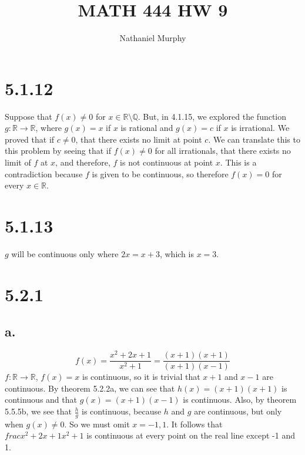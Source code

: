 \documentclass[11pt]{article}
\title{\textbf{MATH 444 HW 9}}
\author{Nathaniel Murphy}
\date{}
\begin{document}
\maketitle

\section*{5.1.12}
Suppose that $f(x)\neq 0$ for $x \in \mathbb{R} \setminus \mathbb{Q}$. But, in 4.1.15, we explored the function $g:\mathbb{R}\rightarrow\mathbb{R}$, where $g(x)=x$ if $x$ is rational and $g(x)=c$ if $x$ is irrational. We proved that if $c\neq 0$, that there exists no limit at point $c$. We can translate this to this problem by seeing that if $f(x)\neq 0$ for all irrationals, that there exists no limit of $f$ at $x$, and therefore, $f$ is not continuous at point $x$. This is a contradiction because $f$ is given to be continuous, so therefore $f(x)=0$ for every $x\in\mathbb{R}$.

\section*{5.1.13}
$g$ will be continuous only where $2x=x+3$, which is $x=3$.

\section*{5.2.1}
\subsection*{a.}
\[f(x)=\frac{x^2+2x+1}{x^2+1}=\frac{(x+1)(x+1)}{(x+1)(x-1)}\]
$f:\mathbb{R}\rightarrow\mathbb{R}$, $f(x)=x$ is continuous, so it is trivial that $x+1$ and $x-1$ are continuous. By theorem 5.2.2a, we can see that $h(x)=(x+1)(x+1)$ is continuous and that $g(x)=(x+1)(x-1)$ is continuous. Also, by theorem 5.5.5b, we see that $\frac{h}{g}$ is continuous, because $h$ and $g$ are continuous, but only when $g(x)\neq 0$. So we must omit $x=-1,1$. It follows that $frac{x^2+2x+1}{x^2+1}$ is continuous at every point on the real line except -1 and 1.
\end{document}
